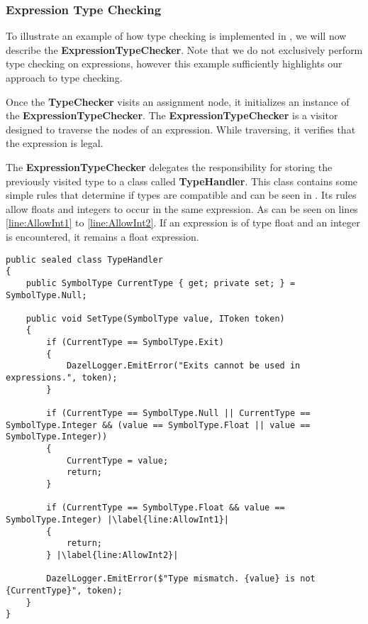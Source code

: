 \subsubsection*{Expression Type Checking} \label{sec:ExpressionTypeChecking}
To illustrate an example of how type checking is implemented in \dazel{}, we will now describe the \textbf{ExpressionTypeChecker}.
Note that we do not exclusively perform type checking on expressions, however this example sufficiently highlights our approach to type checking.


Once the \textbf{TypeChecker} visits an assignment node, it initializes an instance of the \textbf{ExpressionTypeChecker}. The \textbf{ExpressionTypeChecker} is a visitor designed to traverse the nodes of an expression. While traversing, it verifies that the expression is legal.

The \textbf{ExpressionTypeChecker} delegates the responsibility for storing the previously visited type to a class called \textbf{TypeHandler}. This class contains some simple rules that determine if types are compatible and can be seen in . 
Its rules allow floats and integers to occur in the same expression. As can be seen on lines \ref{line:AllowInt1} to \ref{line:AllowInt2}. If an expression is of type float and an integer is encountered, it remains a float expression.

\begin{lstlisting}[language=CSharp, caption={The \textbf{TypeHandler} class.}, label={lst:TypeHandler},escapechar=|]
public sealed class TypeHandler
{
    public SymbolType CurrentType { get; private set; } = SymbolType.Null;

    public void SetType(SymbolType value, IToken token)
    {
        if (CurrentType == SymbolType.Exit)
        {
            DazelLogger.EmitError("Exits cannot be used in expressions.", token);
        }
            
        if (CurrentType == SymbolType.Null || CurrentType == SymbolType.Integer && (value == SymbolType.Float || value == SymbolType.Integer))
        {
            CurrentType = value;
            return;
        }
            
        if (CurrentType == SymbolType.Float && value == SymbolType.Integer) |\label{line:AllowInt1}|
        {
            return;
        } |\label{line:AllowInt2}|
            
        DazelLogger.EmitError($"Type mismatch. {value} is not {CurrentType}", token);
    }
}
\end{lstlisting}

